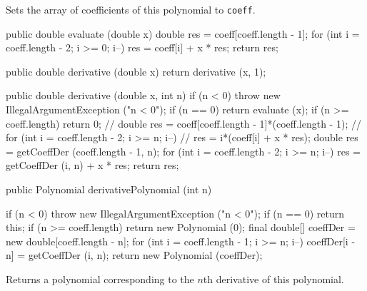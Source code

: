 \begin{tabb}   Sets the array of coefficients of this polynomial to \texttt{coeff}.
\end{tabb}
\begin{htmlonly}
\end{htmlonly}
\begin{code}\begin{hide}

   public double evaluate (double x) {
      double res = coeff[coeff.length - 1];
      for (int i = coeff.length - 2; i >= 0; i--)
         res = coeff[i] + x * res;
      return res;
   }

   public double derivative (double x) {
      return derivative (x, 1);
   }

   public double derivative (double x, int n) {
      if (n < 0)
         throw new IllegalArgumentException ("n < 0");
      if (n == 0)
         return evaluate (x);
      if (n >= coeff.length)
         return 0;
//      double res = coeff[coeff.length - 1]*(coeff.length - 1);
//      for (int i = coeff.length - 2; i >= n; i--)
//         res = i*(coeff[i] + x * res);
      double res = getCoeffDer (coeff.length - 1, n);
      for (int i = coeff.length - 2; i >= n; i--)
         res = getCoeffDer (i, n) + x * res;
      return res;
   }\end{hide}

   public Polynomial derivativePolynomial (int n)\begin{hide} {
      if (n < 0)
         throw new IllegalArgumentException ("n < 0");
      if (n == 0)
         return this;
      if (n >= coeff.length)
         return new Polynomial (0);
      final double[] coeffDer = new double[coeff.length - n];
      for (int i = coeff.length - 1; i >= n; i--)
         coeffDer[i - n] = getCoeffDer (i, n);
      return new Polynomial (coeffDer);
   }\end{hide}
\end{code}
\begin{tabb} Returns a polynomial corresponding to the $n$th derivative of
this polynomial.
\end{tabb}
\begin{htmlonly}
\end{htmlonly}
